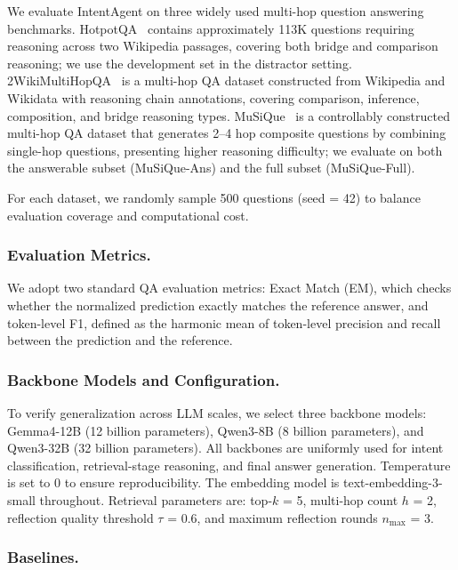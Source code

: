 \documentclass[runningheads]{llncs}
\begin{document}
We evaluate IntentAgent on three widely used multi-hop question answering benchmarks. HotpotQA~\cite{ref20} contains approximately 113K questions requiring reasoning across two Wikipedia passages, covering both bridge and comparison reasoning; we use the development set in the distractor setting. 2WikiMultiHopQA~\cite{ref21} is a multi-hop QA dataset constructed from Wikipedia and Wikidata with reasoning chain annotations, covering comparison, inference, composition, and bridge reasoning types. MuSiQue~\cite{ref22} is a controllably constructed multi-hop QA dataset that generates 2--4 hop composite questions by combining single-hop questions, presenting higher reasoning difficulty; we evaluate on both the answerable subset (MuSiQue-Ans) and the full subset (MuSiQue-Full).

For each dataset, we randomly sample 500 questions (seed = 42) to balance evaluation coverage and computational cost.

\subsubsection{Evaluation Metrics.}

We adopt two standard QA evaluation metrics: Exact Match (EM), which checks whether the normalized prediction exactly matches the reference answer, and token-level F1, defined as the harmonic mean of token-level precision and recall between the prediction and the reference.

\subsubsection{Backbone Models and Configuration.}

To verify generalization across LLM scales, we select three backbone models: Gemma4-12B (12 billion parameters), Qwen3-8B (8 billion parameters), and Qwen3-32B (32 billion parameters). All backbones are uniformly used for intent classification, retrieval-stage reasoning, and final answer generation. Temperature is set to 0 to ensure reproducibility. The embedding model is text-embedding-3-small throughout. Retrieval parameters are: top-$k$ = 5, multi-hop count $h$ = 2, reflection quality threshold $\tau$ = 0.6, and maximum reflection rounds $n_{\max}$ = 3.

\subsubsection{Baselines.}
\end{document}
